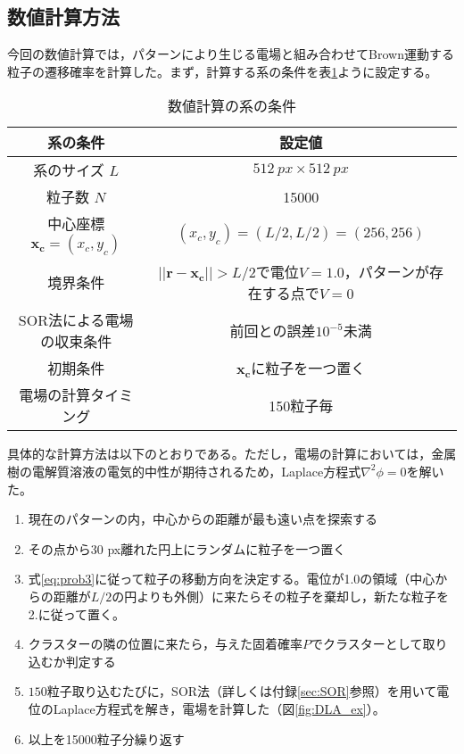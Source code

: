 \documentclass[autodetect-engine,dvi=dvipdfmx,a4paper,ja=standard,oneside,openany,11pt,draft]{bxjsbook}
\begin{document}
\subsection{数値計算方法}
今回の数値計算では，パターンにより生じる電場と組み合わせてBrown運動する粒子の遷移確率を計算した。まず，計算する系の条件を表\ref{tab:condition}ように設定する。
\begin{table}[htbp]
  \centering
  \caption{数値計算の系の条件　}
  \begin{tabular}{|c||c|}
    \hline
    系の条件                      & 設定値                                                  \\ \hline\hline
    系のサイズ $L$                 & $\SI{512}{px}\times\SI{512}{px}$                     \\ \hline
    粒子数 $N$                   & 15000                                                \\ \hline
    中心座標 $\bm{x_c}=(x_c,y_c)$ & $(x_c,y_c)=(L/2,L/2)=(256,256)$                      \\ \hline
    境界条件                      & $||\bm{r}-\bm{x_c}||>L/2$で電位$V=1.0$，パターンが存在する点で$V=0$ \\ \hline
    SOR法による電場の収束条件            & 前回との誤差$10^{-5}$未満                                    \\ \hline
    初期条件                      & $\bm{x_c}$に粒子を一つ置く                                   \\ \hline
    電場の計算タイミング                & 150粒子毎                                               \\ \hline
  \end{tabular}
  \label{tab:condition}
\end{table}

具体的な計算方法は以下のとおりである。ただし，電場の計算においては，金属樹の電解質溶液の電気的中性が期待されるため，Laplace方程式$\nabla^2\phi=0$を解いた。
\begin{samepage}
  \begin{enumerate}
    \item 現在のパターンの内，中心からの距離が最も遠い点を探索する
    \item その点から30 px離れた円上にランダムに粒子を一つ置く
    \item 式\ref{eq:prob3}に従って粒子の移動方向を決定する。電位が1.0の領域（中心からの距離が$L/2$の円よりも外側）に来たらその粒子を棄却し，新たな粒子を2.に従って置く。
    \item クラスターの隣の位置に来たら，与えた固着確率$P$でクラスターとして取り込むか判定する
    \item $150$粒子取り込むたびに，SOR法（詳しくは付録\ref{sec:SOR}参照）を用いて電位のLaplace方程式を解き，電場を計算した（図\ref{fig:DLA_ex}）。
    \item 以上を15000粒子分繰り返す
  \end{enumerate}
\end{samepage}
\end{document}
